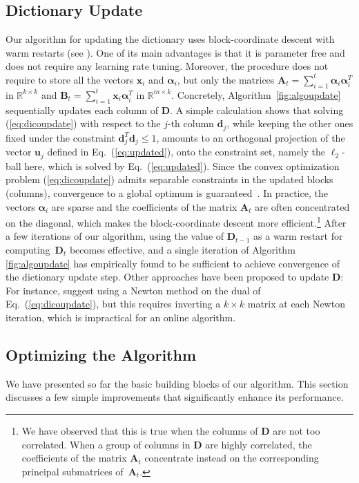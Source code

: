 \documentclass[twoside,11pt]{article}
\def\x{{\mathbf x}}
\def\alphab{{\boldsymbol\alpha}}
\def\D{{\mathbf D}}
\def\B{{\mathbf B}}
\def\d{{\mathbf d}}
\def\d{{\mathbf d}}
\def\u{{\mathbf u}}
\def\Real{{\mathbb R}}
\def\u{{\mathbf u}}
\def\A{{\mathbf A}}
\begin{document}
\subsection{Dictionary Update\label{subsec:dicoupdate}}
Our algorithm for updating the dictionary uses block-coordinate descent with
warm restarts (see \citealp{bertsekas}). One of its main advantages is that it is
parameter free and does not require any learning rate tuning. 
Moreover, the procedure does not require to store all the vectors $\x_i$ and $\alphab_i$,
but only the matrices $\A_t=\sum_{i=1}^t \alphab_i \alphab_i^T$ in $\Real^{k \times k}$ and
$\B_t=\sum_{i=1}^t \x_i\alphab_i^T$ in $\Real^{m \times k}$.
 Concretely,
Algorithm~\ref{fig:algoupdate} sequentially updates each column of $\D$.
A simple calculation shows 
that solving (\ref{eq:dicoupdate}) with respect to the $j$-th column $\d_j$, while keeping the other ones fixed under the constraint $\d_j^T\d_j \leq
1$, amounts to an orthogonal projection of the vector $\u_j$ defined in Eq.~(\ref{eq:updated}), onto the
constraint set, namely the $\ell_2$-ball here, which is solved by
Eq.~(\ref{eq:updated}).  Since the convex optimization
problem (\ref{eq:dicoupdate}) admits separable
constraints in the updated blocks (columns), convergence to a global
optimum is guaranteed~\mbox{\citep{bertsekas}}. In practice, the vectors
$\alphab_i$ are sparse and the coefficients of the matrix $\A_t$ are 
often concentrated on the diagonal, which makes the
block-coordinate descent more efficient.\footnote{We have observed that this is true when the columns of $\D$ are not too correlated. When a group of columns in $\D$ are highly correlated, the coefficients of the matrix $\A_t$ concentrate instead on the corresponding principal submatrices of~$\A_t$.}
After a few iterations of our algorithm, using the value of $\D_{t-1}$ as a warm restart for computing~$\D_t$ 
becomes effective, and a single iteration of Algorithm \ref{fig:algoupdate} has
empirically found to be sufficient to achieve
convergence of the dictionary update step. Other approaches have been proposed to update $\D$: For
instance,
\citet{lee} suggest using a Newton method on the dual of
Eq.~(\ref{eq:dicoupdate}), but this requires inverting a $k
\times k$ matrix at each Newton iteration, which is impractical for
an online algorithm.
\subsection{Optimizing the Algorithm\label{sec:variants}}
We have presented so far the basic building blocks of our algorithm.
This section discusses a few simple improvements that significantly
enhance its performance.
\end{document}
